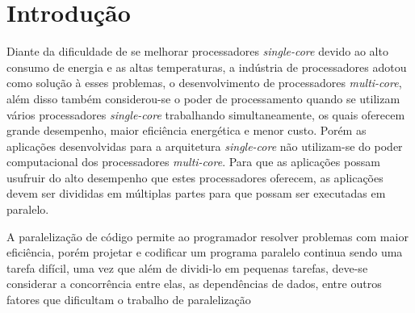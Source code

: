 \chapter*{Introdução}

Diante da  dificuldade de se melhorar processadores \textit{single-core} devido ao alto consumo de energia e as altas
temperaturas, a indústria de processadores adotou como solução à esses
problemas, o desenvolvimento de processadores \textit{multi-core},
além disso também considerou-se o poder de processamento quando se utilizam vários processadores \textit{single-core} 
trabalhando simultaneamente, os quais oferecem grande desempenho, maior eficiência energética e menor custo.
Porém as aplicações desenvolvidas para a arquitetura \textit{single-core} não utilizam-se do poder computacional dos processadores \textit{multi-core}.
Para que as aplicações possam usufruir do alto desempenho que estes processadores oferecem, as aplicações devem ser 
divididas em múltiplas partes para que possam ser executadas em paralelo.

A paralelização de código permite ao programador resolver problemas com maior eficiência, porém projetar e codificar um 
programa paralelo continua sendo uma tarefa difícil, uma vez que além de dividi-lo em pequenas tarefas, deve-se considerar a 
concorrência entre elas, as dependências de dados, entre outros fatores que dificultam o trabalho de paralelização 

